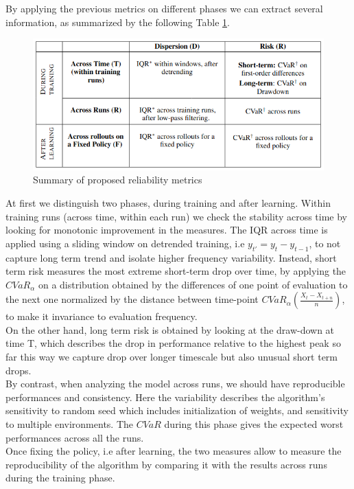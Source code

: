 \documentclass{article}
\begin{document}
By applying the previous metrics on different phases we can extract several information, as summarized by the following Table \ref{fig:table}.
\begin{figure}[!htp]
	\centering
	\includegraphics[scale=0.3]{./images/table.png}
	\caption{Summary of proposed reliability metrics~\cite{GoogleMeasure}}
	\label{fig:table}
	\footnotesize{}
\end{figure}
At first we distinguish two phases, during training and after learning.
Within training runs (across time, within each run) we check the stability across time by looking for monotonic improvement in the measures.
The IQR across time is applied using a sliding window on detrended training, i.e $y_{t'} = y_{t} - y_{t-1}$, to not capture long term trend and isolate higher frequency variability.
Instead, short term risk measures the most extreme short-term drop over time, by applying the $CVaR_\alpha$ on a distribution obtained by the differences of one point of evaluation to the next one normalized by the distance between time-point $CVaR_\alpha \left(\frac{X_t - X_{t+n}}{n}\right)$, to make it invariance to evaluation frequency.\\
On the other hand, long term risk is obtained by looking at the draw-down at time T, which describes the drop in performance relative to the highest peak so far this way we capture drop over longer timescale but also unusual short term drops.\\
By contrast, when analyzing the model across runs, we should have reproducible performances and consistency. Here the variability describes the algorithm’s sensitivity to random seed which includes initialization of weights, and sensitivity to multiple environments. The $CVaR$ during this phase gives the expected worst performances across all the runs.\\
Once fixing the policy, i.e after learning, the two measures allow to measure the reproducibility of the algorithm by comparing it with the results across runs during the training phase.
\end{document}
